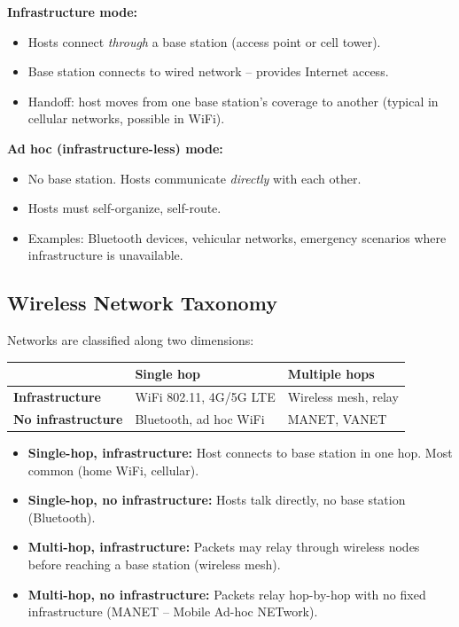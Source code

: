\begin{keybox}
\textbf{Infrastructure mode:}
\begin{itemize}[noitemsep]
    \item Hosts connect \emph{through} a base station (access point or cell tower).
    \item Base station connects to wired network -- provides Internet access.
    \item Handoff: host moves from one base station's coverage to another (typical in cellular networks, possible in WiFi).
\end{itemize}

\medskip
\textbf{Ad hoc (infrastructure-less) mode:}
\begin{itemize}[noitemsep]
    \item No base station. Hosts communicate \emph{directly} with each other.
    \item Hosts must self-organize, self-route.
    \item Examples: Bluetooth devices, vehicular networks, emergency scenarios where infrastructure is unavailable.
\end{itemize}
\end{keybox}

\subsection{Wireless Network Taxonomy}

\begin{keybox}
Networks are classified along two dimensions:

\begin{center}
\begin{tabular}{|l|l|l|}
\hline
 & \textbf{Single hop} & \textbf{Multiple hops} \\
\hline
\textbf{Infrastructure} & WiFi 802.11, 4G/5G LTE & Wireless mesh, relay \\
\hline
\textbf{No infrastructure} & Bluetooth, ad hoc WiFi & MANET, VANET \\
\hline
\end{tabular}
\end{center}

\begin{itemize}[noitemsep]
    \item \textbf{Single-hop, infrastructure:} Host connects to base station in one hop. Most common (home WiFi, cellular).
    \item \textbf{Single-hop, no infrastructure:} Hosts talk directly, no base station (Bluetooth).
    \item \textbf{Multi-hop, infrastructure:} Packets may relay through wireless nodes before reaching a base station (wireless mesh).
    \item \textbf{Multi-hop, no infrastructure:} Packets relay hop-by-hop with no fixed infrastructure (MANET -- Mobile Ad-hoc NETwork).
\end{itemize}
\end{keybox}

